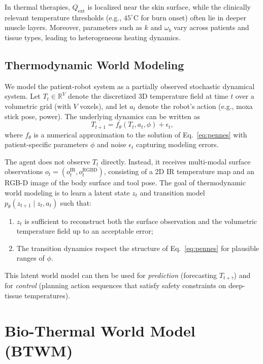 \documentclass{article}
\begin{document}
In thermal therapies, $Q_{\mathrm{ext}}$ is localized near the skin surface, while the clinically relevant temperature thresholds (e.g., $45^\circ$C for burn onset) often lie in deeper muscle layers. Moreover, parameters such as $k$ and $\omega_b$ vary across patients and tissue types, leading to heterogeneous heating dynamics.

\subsection{Thermodynamic World Modeling}

We model the patient-robot system as a partially observed stochastic dynamical system. Let $T_t \in \mathbb{R}^{V}$ denote the discretized 3D temperature field at time $t$ over a volumetric grid (with $V$ voxels), and let $a_t$ denote the robot's action (e.g., moxa stick pose, power). The underlying dynamics can be written as
\begin{equation}
    T_{t+1} = f_{\theta}(T_t, a_t, \phi) + \epsilon_t,
\end{equation}
where $f_{\theta}$ is a numerical approximation to the solution of Eq.~\eqref{eq:pennes} with patient-specific parameters $\phi$ and noise $\epsilon_t$ capturing modeling errors.

The agent does not observe $T_t$ directly. Instead, it receives multi-modal surface observations $o_t = (o_t^{\mathrm{IR}}, o_t^{\mathrm{RGBD}})$, consisting of a 2D IR temperature map and an RGB-D image of the body surface and tool pose. The goal of thermodynamic world modeling is to learn a latent state $z_t$ and transition model $p_{\theta}(z_{t+1} \mid z_t, a_t)$ such that:
\begin{enumerate}
    \item $z_t$ is sufficient to reconstruct both the surface observation and the volumetric temperature field up to an acceptable error;
    \item The transition dynamics respect the structure of Eq.~\eqref{eq:pennes} for plausible ranges of $\phi$.
\end{enumerate}

This latent world model can then be used for \emph{prediction} (forecasting $T_{t+\tau}$) and for \emph{control} (planning action sequences that satisfy safety constraints on deep-tissue temperatures).


\section{Bio-Thermal World Model (BTWM)}
\label{sec:method}
\end{document}
